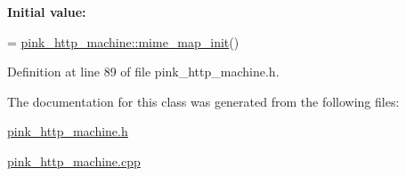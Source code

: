 {\bfseries Initial value\+:}
\begin{DoxyCode}
= 
                                \hyperlink{classpink__http__machine_ad6d404392628f4b2c94a4b30fefb62f8}{pink\_http\_machine::mime\_map\_init}()
\end{DoxyCode}


Definition at line 89 of file pink\+\_\+http\+\_\+machine.\+h.



The documentation for this class was generated from the following files\+:\begin{DoxyCompactItemize}
\item 
\hyperlink{pink__http__machine_8h}{pink\+\_\+http\+\_\+machine.\+h}\item 
\hyperlink{pink__http__machine_8cpp}{pink\+\_\+http\+\_\+machine.\+cpp}\end{DoxyCompactItemize}
